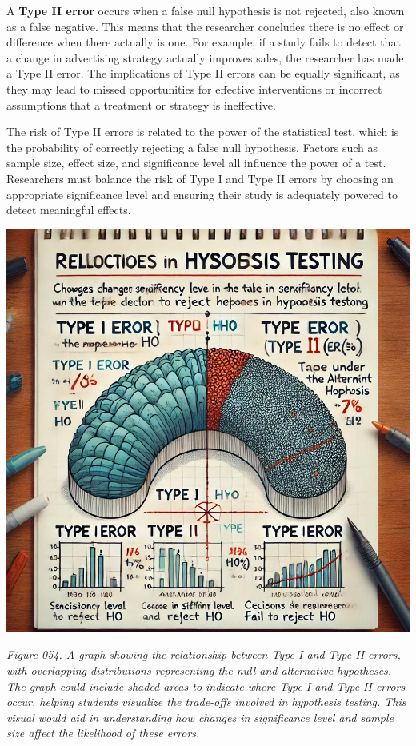 \documentclass[
]{book}
\begin{document}
A \textbf{Type II error} occurs when a false null hypothesis is not rejected, also known as a false negative. This means that the researcher concludes there is no effect or difference when there actually is one. For example, if a study fails to detect that a change in advertising strategy actually improves sales, the researcher has made a Type II error. The implications of Type II errors can be equally significant, as they may lead to missed opportunities for effective interventions or incorrect assumptions that a treatment or strategy is ineffective.

The risk of Type II errors is related to the power of the statistical test, which is the probability of correctly rejecting a false null hypothesis. Factors such as sample size, effect size, and significance level all influence the power of a test. Researchers must balance the risk of Type I and Type II errors by choosing an appropriate significance level and ensuring their study is adequately powered to detect meaningful effects.

\includegraphics[width=1\textwidth,height=\textheight]{images/fig054.jpg}

\emph{Figure 054. A graph showing the relationship between Type I and Type II errors, with overlapping distributions representing the null and alternative hypotheses. The graph could include shaded areas to indicate where Type I and Type II errors occur, helping students visualize the trade-offs involved in hypothesis testing. This visual would aid in understanding how changes in significance level and sample size affect the likelihood of these errors.}
\end{document}
